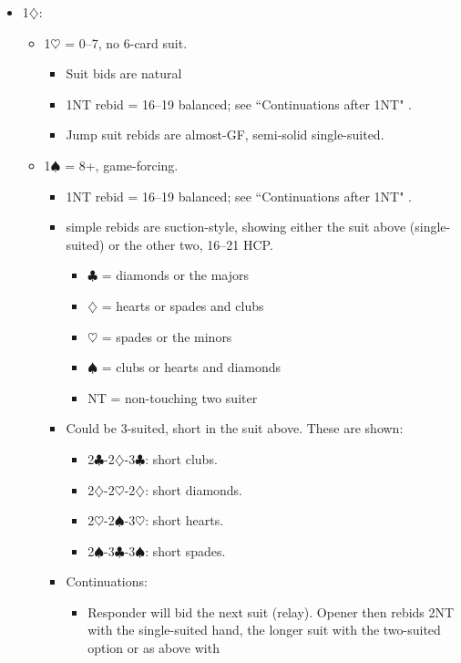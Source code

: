 \documentclass[a4paper,14pt]{extarticle}
\begin{document}
\begin{itemize}
\newpage

\item 1$\diamondsuit$:
	\begin{itemize}
   \item 1$\heartsuit$ = 0--7, no 6-card suit.
		\begin{itemize}
		\item Suit bids are natural
      \item 1NT rebid = 16--19 balanced; see ``Continuations after 1NT" .
      \item Jump suit rebids are almost-GF, semi-solid single-suited.
		\end{itemize}
   \item 1$\spadesuit$ = 8+, game-forcing.
		\begin{itemize}
      \item 1NT rebid = 16--19 balanced; see ``Continuations after 1NT" .
      \item simple rebids are suction-style, showing either the suit above
         (single-suited) or the other two, 16--21 HCP.
			\begin{itemize}
			\item $\clubsuit$ = diamonds or the majors
			\item $\diamondsuit$ = hearts or spades and clubs
			\item $\heartsuit$ = spades or the minors
			\item $\spadesuit$ = clubs or hearts and diamonds
			\item NT = non-touching two suiter
			\end{itemize}
		\item Could be 3-suited, short in the suit above. These are shown: 
			\begin{itemize}
         \item 2$\clubsuit$-2$\diamondsuit$-3$\clubsuit$: short clubs.
			\item 2$\diamondsuit$-2$\heartsuit$-2$\diamondsuit$: short diamonds. 
			\item 2$\heartsuit$-2$\spadesuit$-3$\heartsuit$: short hearts.
         \item 2$\spadesuit$-3$\clubsuit$-3$\spadesuit$: short spades.
			\end{itemize}
		\item Continuations:
			\begin{itemize}
			\item Responder will bid the next suit (relay). Opener then rebids 2NT with the
				single-suited hand, the longer suit with the two-suited option or as above with

\end{itemize}
\end{itemize}
\end{itemize}
\end{itemize}
\end{document}
